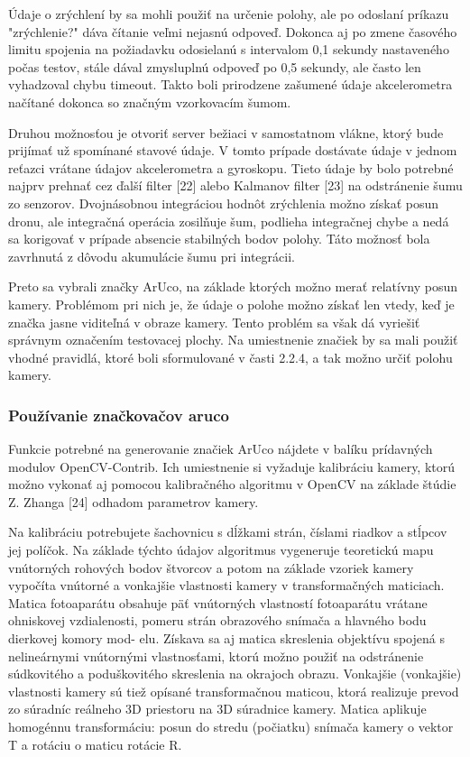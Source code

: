 {Údaje o zrýchlení by sa mohli použiť na určenie polohy, ale po odoslaní príkazu "zrýchlenie?" dáva čítanie veľmi nejasnú odpoveď. Dokonca aj po zmene časového limitu spojenia na požiadavku odosielanú s intervalom 0,1 sekundy nastaveného počas testov, stále dával zmysluplnú odpoveď po 0,5 sekundy, ale často len vyhadzoval chybu timeout. Takto boli prirodzene zašumené údaje akcelerometra načítané dokonca so značným vzorkovacím šumom. 

Druhou možnosťou je otvoriť server bežiaci v samostatnom vlákne, ktorý bude prijímať už spomínané stavové údaje. V tomto prípade dostávate údaje v jednom reťazci vrátane údajov akcelerometra a gyroskopu. Tieto údaje by bolo potrebné najprv prehnať cez ďalší filter [22] alebo Kalmanov filter [23] na odstránenie šumu zo senzorov. Dvojnásobnou integráciou hodnôt zrýchlenia možno získať posun dronu, ale integračná operácia zosilňuje šum, podlieha integračnej chybe a nedá sa korigovať v prípade absencie stabilných bodov polohy. Táto možnosť bola zavrhnutá z dôvodu akumulácie šumu pri integrácii. 

Preto sa vybrali značky ArUco, na základe ktorých možno merať relatívny posun kamery. Problémom pri nich je, že údaje o polohe možno získať len vtedy, keď je značka jasne viditeľná v obraze kamery. Tento problém sa však dá vyriešiť správnym označením testovacej plochy. Na umiestnenie značiek by sa mali použiť vhodné pravidlá, ktoré boli sformulované v časti 2.2.4, a tak možno určiť polohu kamery. 

\subsubsection{Používanie značkovačov aruco}
Funkcie potrebné na generovanie značiek ArUco nájdete v balíku prídavných modulov OpenCV-Contrib. Ich umiestnenie si vyžaduje kalibráciu kamery, ktorú možno vykonať aj pomocou kalibračného algoritmu v OpenCV na základe štúdie Z. Zhanga [24] odhadom parametrov kamery. 

Na kalibráciu potrebujete šachovnicu s dĺžkami strán, číslami riadkov a stĺpcov jej políčok. Na základe týchto údajov algoritmus vygeneruje teoretickú mapu vnútorných rohových bodov štvorcov a potom na základe vzoriek kamery vypočíta vnútorné a vonkajšie vlastnosti kamery v transformačných maticiach. Matica fotoaparátu obsahuje päť vnútorných vlastností fotoaparátu vrátane ohniskovej vzdialenosti, pomeru strán obrazového snímača a hlavného bodu dierkovej komory mod- elu. Získava sa aj matica skreslenia objektívu spojená s nelineárnymi vnútornými vlastnosťami, ktorú možno použiť na odstránenie súdkovitého a poduškovitého skreslenia na okrajoch obrazu. Vonkajšie (vonkajšie) vlastnosti kamery sú tiež opísané transformačnou maticou, ktorá realizuje prevod zo súradníc reálneho 3D priestoru na 3D súradnice kamery. Matica aplikuje homogénnu transformáciu: posun do stredu (počiatku) snímača kamery o vektor T a rotáciu o maticu rotácie R. 

}
